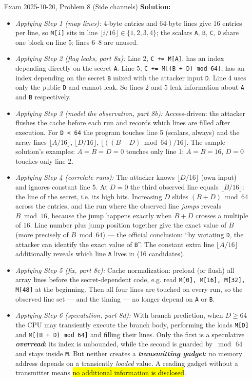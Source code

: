 \documentclass[12pt, a4paper]{article}
\newcommand{\term}[1]{\textbf{\textit{#1}}}        %
\newcommand{\imp}[1]{\hl{#1}}                       %
\begin{document}
\begin{practicebox}{Exam 2025-10-20, Problem 8 (Side channels)}
\textbf{Solution:}
\begin{itemize}
    \item \textit{Applying Step 1 (map lines):} 4-byte entries and 64-byte lines give 16 entries per line, so \texttt{M[i]} sits in line $\lfloor i/16 \rfloor \in \{1,2,3,4\}$; the scalars \texttt{A}, \texttt{B}, \texttt{C}, \texttt{D} share one block on line 5; lines 6--8 are unused.
    \item \textit{Applying Step 2 (flag leaks, part 8a):} Line 2, \texttt{C += M[A]}, has an index depending directly on the secret \texttt{A}. Line 5, \texttt{C += M[(B + D) mod 64]}, has an index depending on the secret \texttt{B} mixed with the attacker input \texttt{D}. Line 4 uses only the public \texttt{D} and cannot leak. So lines 2 and 5 leak information about \texttt{A} and \texttt{B} respectively.
    \item \textit{Applying Step 3 (model the observation, part 8b):} Access-driven: the attacker flushes the cache before each run and records which lines are filled after execution. For \texttt{D < 64} the program touches line 5 (scalars, always) and the array lines $\lfloor A/16 \rfloor$, $\lfloor D/16 \rfloor$, $\lfloor ((B + D) \bmod 64)/16 \rfloor$. The sample solution's examples: $A = B = D = 0$ touches only line 1; $A = B = 16$, $D = 0$ touches only line 2.
    \item \textit{Applying Step 4 (correlate runs):} The attacker knows $\lfloor D/16 \rfloor$ (own input) and ignores constant line 5. At $D = 0$ the third observed line equals $\lfloor B/16 \rfloor$: the line of the secret, i.e. its high bits. Increasing $D$ slides $(B + D) \bmod 64$ across the entries, and the run where the observed line \emph{jumps} reveals $B \bmod 16$, because the jump happens exactly when $B + D$ crosses a multiple of 16. Line number plus jump position together give the exact value of $B$ (more precisely of $B \bmod 64$) --- the official conclusion: ``by variating \texttt{D}, the attacker can identify the exact value of \texttt{B}''. The constant extra line $\lfloor A/16 \rfloor$ additionally reveals which line \texttt{A} lives in (16 candidates).
    \item \textit{Applying Step 5 (fix, part 8c):} Cache normalization: preload (or flush) all array lines before the secret-dependent code, e.g. read \texttt{M[0], M[16], M[32], M[48]} at the beginning. Then all four lines are touched on every run, so the observed line set --- and the timing --- no longer depend on \texttt{A} or \texttt{B}.
    \item \textit{Applying Step 6 (speculation, part 8d):} With branch prediction, when $D \geq 64$ the CPU may transiently execute the branch body, performing the loads \texttt{M[D]} and \texttt{M[(B + D) mod 64]} and filling their lines. Only the first is a speculative \term{overread}: its index is unbounded, while the second is guarded by $\bmod\, 64$ and stays inside \texttt{M}. But neither creates a \term{transmitting gadget}: no memory address depends on a transiently \emph{loaded} value. A reading gadget without a transmitter means \imp{no additional information is disclosed}.

\end{itemize}
\end{practicebox}
\end{document}
